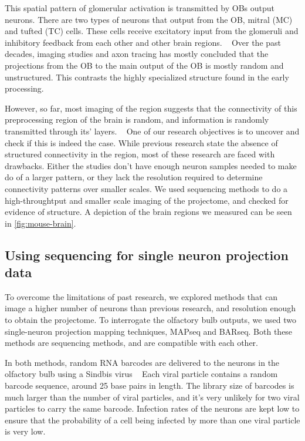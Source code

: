 \documentclass[../dissertation.tex]{subfiles}
\begin{document}
This spatial pattern of glomerular activation is transmitted by OBs output neurons.
There are two types of neurons that output from the OB, mitral (MC) and tufted (TC) cells.
These cells receive excitatory input from the glomeruli and inhibitory feedback from each other and other brain regions.
~\cite{mapseq008,mapseq010,mapseq011,mapseq012,mapseq013,mapseq014}
Over the past decades, imaging studies and axon tracing has mostly concluded that the projections from the OB to the main output of the OB is mostly random and unstructured.
This contrasts the highly specialized structure found in the early processing.

However, so far, most imaging of the region suggests that the connectivity of this preprocessing region of the brain is random, and information is randomly transmitted through its' layers.
~\cite{mapseq015,mapseq016,mapseq017,mapseq018,mapseq019,mapseq020,mapseq021,mapseq022,mapseq023,mapseq024,mapseq025,mapseq026,mapseq027}
One of our research objectives is to uncover and check if this is indeed the case.
While previous research state the absence of structured connectivity in the region, most of these research are faced with drawbacks.
Either the studies don't have enough neuron samples needed to make do of a larger pattern, or they lack the resolution required to determine connectivity patterns over smaller scales.
We used sequencing methods to do a high-throughtput and smaller scale imaging of the projectome, and checked for evidence of structure.
A depiction of the brain regions we measured can be seen in \cref{fig:mouse-brain}.

\subsection{Using sequencing for single neuron projection data}

To overcome the limitations of past research, we explored methods that can image a higher number of neurons than previous research, and resolution enough to obtain the projectome.
To interrogate the olfactory bulb outputs, we used two single-neuron projection mapping techniques, MAPseq and BARseq.
Both these methods are sequencing methods, and are compatible with each other.

In both methods, random RNA barcodes are delivered to the neurons in the olfactory bulb using a Sindbis virus
~\cite{mapseq058,mapseq059,mapseq061}
Each viral particle contains a random barcode sequence, around 25 base pairs in length.
The library size of barcodes is much larger than the number of viral particles, and it's very unlikely for two viral particles to carry the same barcode.
Infection rates of the neurons are kept low to ensure that the probability of a cell being infected by more than one viral particle is very low.
~\cite{mapseq058,mapseq059,mapseq061}
\end{document}
